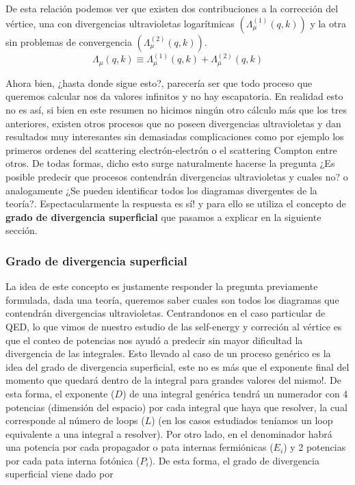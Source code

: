 \documentclass[tickz]{article}
\numberwithin{equation}{section}
\begin{document}
De esta relación podemos ver que existen dos contribuciones a la corrección del vértice, una con divergencias ultravioletas logarítmicas $ (\Lambda_{\mu}^{(1)}(q,k)) $ y la otra sin problemas de convergencia $ (\Lambda_{\mu}^{(2)}(q,k)) $.\\

\begin{equation}
\Lambda_{\mu}(q,k) \equiv \Lambda_{\mu}^{(1)}(q,k) + \Lambda_{\mu}^{(2)}(q,k)
\end{equation}
 
Ahora bien, ¿hasta donde sigue esto?, parecería ser que todo proceso que queremos calcular nos da valores infinitos y no hay escapatoria. En realidad esto no es así, si bien en este resumen no hicimos ningún otro cálculo más que los tres anteriores, existen otros procesos que no poseen divergencias ultravioletas y dan resultados muy interesantes sin demasiadas complicaciones como por ejemplo los primeros ordenes del scattering electrón-electrón o el scattering Compton entre otros. De todas formas, dicho esto surge naturalmente hacerse la pregunta ¿Es posible predecir que procesos contendrán divergencias ultravioletas y cuales no? o analogamente ¿Se pueden identificar todos los diagramas divergentes de la teoría?. Espectacularmente la respuesta es sí! y para ello se utiliza el concepto de \textbf{grado de divergencia superficial} que pasamos a explicar en la siguiente sección.

\subsubsection{Grado de divergencia superficial}\label{sec_superficial}

La idea de este concepto es justamente responder la pregunta previamente formulada, dada una teoría, queremos saber cuales son todos los diagramas que contendrán divergencias ultravioletas. Centrandonos en el caso particular de QED, lo que vimos de nuestro estudio de las self-energy y correción al vértice es que el conteo de potencias nos ayudó a predecir sin mayor dificultad la divergencia de las integrales. Esto llevado al caso de un proceso genérico es la idea del grado de divergencia superficial, este no es más que el exponente final del momento que quedará dentro de la integral para grandes valores del mismo!. De esta forma, el exponente ($ D $) de una integral genérica tendrá un numerador con 4 potencias (dimensión del espacio) por cada integral que haya que resolver, la cual corresponde al número de loops ($ L $) (en los casos estudiados teníamos un loop equivalente a una integral a resolver). Por otro lado, en el denominador habrá una potencia por cada propagador o pata internas fermiónicas ($ E_i $) y 2 potencias por cada pata interna fotónica ($ P_i $). De esta forma, el grado de divergencia superficial viene dado por
\end{document}
